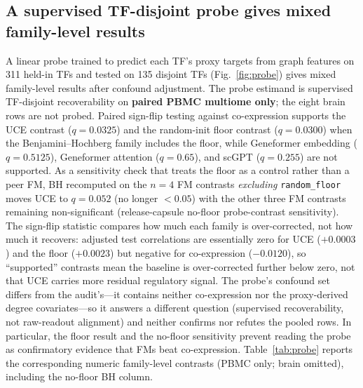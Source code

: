 \documentclass[fleqn,10pt,lineno]{wlpeerj}
\newcommand{\fitfig}[1]{\resizebox{\ifdim\width>\linewidth\linewidth\else\width\fi}{!}{#1}}
\begin{document}
\subsection{A supervised TF-disjoint probe gives mixed family-level results}
A linear probe trained to predict each TF's proxy targets from graph features on 311 held-in TFs
and tested on 135 disjoint TFs (Fig.~\ref{fig:probe}) gives mixed family-level results after confound
adjustment. The probe estimand is supervised TF-disjoint recoverability on \textbf{paired PBMC
multiome only}; the eight brain rows are not probed. Paired sign-flip testing against co-expression
supports the UCE contrast ($q=0.0325$) and the random-init floor contrast ($q=0.0300$) when the
Benjamini--Hochberg family includes the floor, while Geneformer embedding ($q=0.5125$), Geneformer
attention ($q=0.65$), and scGPT ($q=0.255$) are not supported. As a sensitivity check that treats
the floor as a control rather than a peer FM, BH recomputed on the $n=4$ FM contrasts
\emph{excluding} \texttt{random\_floor} moves UCE to $q=0.052$ (no longer $<0.05$) with the other
three FM contrasts remaining non-significant
(release-capsule no-floor probe-contrast sensitivity). The sign-flip statistic compares how
much each family is over-corrected, not how much it recovers: adjusted test correlations are
essentially zero for UCE ($+0.0003$) and the floor ($+0.0023$) but negative for co-expression
($-0.0120$), so ``supported'' contrasts mean the baseline is over-corrected further below zero, not
that UCE carries more residual regulatory signal. The probe's confound set differs from the
audit's---it contains neither co-expression nor the proxy-derived degree covariates---so it answers a
different question (supervised recoverability, not raw-readout alignment) and neither confirms nor
refutes the pooled rows. In particular, the floor result and the no-floor sensitivity prevent reading
the probe as confirmatory evidence that FMs beat co-expression.
Table~\ref{tab:probe} reports the corresponding numeric family-level contrasts (PBMC only; brain
omitted), including the no-floor BH column.

\begin{table}[!tbp]\centering
\fitfig{}
\caption{TF-disjoint probe numeric contrasts on paired PBMC multiome only (eight brain rows
omitted). A linear probe is trained on 311 TFs and tested on 135 disjoint TFs; $\rho$ is the
confound-adjusted mean test Spearman. $\Delta\rho$ vs base is versus co-expression. Paired
sign-flip $q_{\mathrm{flip}}$ includes the random-init floor in the BH family ($n=5$ FM contrasts
+ floor); the no-floor column recomputes BH on the $n=4$ FM contrasts excluding the floor (UCE
moves to $q=0.052$). ``Supported'' contrasts mean the baseline is over-corrected further below
zero, not that the FM recovers residual regulation.}\label{tab:probe}
\end{table}
\end{document}

